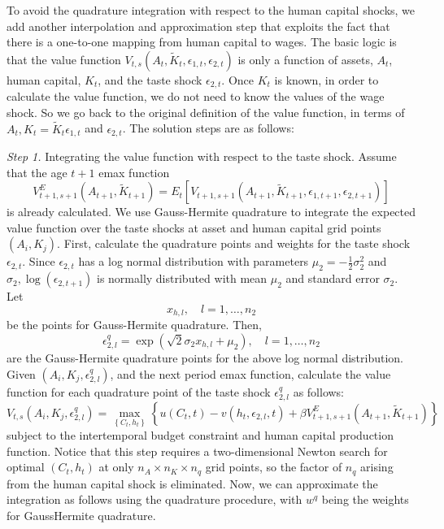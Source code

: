 \documentclass[\econtexRoot/ImaiKeane]{subfiles}
\begin{document}
To avoid the quadrature integration with respect to the human capital shocks, we add another interpolation and approximation step that exploits the fact that there is a one-to-one mapping from human capital to wages. The basic logic is that the value function $V_{t, s}\left(A_t, \tilde{K}_t, \epsilon_{1, t}, \epsilon_{2, t}\right)$ is only a function of assets, $A_t$, human capital, $K_t$, and the taste shock $\epsilon_{2, t}$. Once $K_t$ is known, in order to calculate the value function, we do not need to know the values of the wage shock. So we go back to the original definition of the value function, in terms of $A_t, K_t=\tilde{K}_t \epsilon_{1, t}$ and $\epsilon_{2, t}$. The solution steps are as follows: \par
\medskip
\textit{Step 1.}     Integrating the value function with respect to the taste shock. Assume that the age $t+1$ emax function
$$
V_{t+1, s+1}^E\left(A_{t+1}, \tilde{K}_{t+1}\right)=E_t\left[V_{t+1, s+1}\left(A_{t+1}, \tilde{K}_{t+1}, \epsilon_{1, t+1}, \epsilon_{2, t+1}\right)\right]
$$
is already calculated. We use Gauss-Hermite quadrature to integrate the expected value function over the taste shocks at asset and human capital grid points $\left(A_i, K_j\right)$. First, calculate the quadrature points and weights for the taste shock $\epsilon_{2, t}$. Since $\epsilon_{2, t}$ has a log normal distribution with parameters $\mu_2=-\frac{1}{2} \sigma_2^2$ and $\sigma_2, \log \left(\epsilon_{2, t+1}\right)$ is normally distributed with mean $\mu_2$ and standard error $\sigma_2$. Let
$$
x_{h, l}, \quad l=1, \ldots, n_2
$$
be the points for Gauss-Hermite quadrature. Then,
$$
\epsilon_{2, l}^q=\exp \left(\sqrt{2} \sigma_2 x_{h, l}+\mu_2\right), \quad l=1, \ldots, n_2
$$
are the Gauss-Hermite quadrature points for the above log normal distribution. Given $\left(A_i, K_j, \epsilon_{2, l}^q\right)$, and the next period emax function, calculate the value function for each quadrature point of the taste shock $\epsilon_{2, l}^q$ as follows:
$$
V_{t, s}\left(A_i, K_j, \epsilon_{2, l}^q\right)=\max _{\left\{C_t, h_t\right\}}\left\{u\left(C_t, t\right)-v\left(h_t, \epsilon_{2, l}, t\right)+\beta V_{t+1, s+1}^E\left(A_{t+1}, \tilde{K}_{t+1}\right)\right\}
$$
subject to the intertemporal budget constraint and human capital production function. Notice that this step requires a two-dimensional Newton search for optimal $\left(C_t, h_t\right)$ at only $n_A \times n_K \times n_q$ grid points, so the factor of $n_q$ arising from the human capital shock is eliminated. Now, we can approximate the integration as follows using the quadrature procedure, with $w^q$ being the weights for GaussHermite quadrature.
\end{document}
